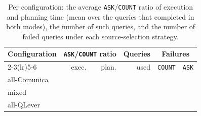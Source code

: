 \begin{table}[t]
	\centering
	\caption{Per configuration: the average \texttt{ASK}/\texttt{COUNT} ratio of
		execution and planning time (mean over the queries that completed in both
		modes), the number of such queries, and the number of failed queries under
		each source-selection strategy.}
	\label{tab:overall-ratio-adhoc}
	\begin{tabular}{lrrrrr}
		\toprule
		Configuration & \multicolumn{2}{c}{\texttt{ASK}/\texttt{COUNT} ratio} & Queries & \multicolumn{2}{c}{Failures} \\
		\cmidrule(lr){2-3}\cmidrule(lr){5-6}
		             & exec. & plan. & used & \texttt{COUNT} & \texttt{ASK} \\
		\midrule
		all-Comunica & {} & {} & {} & {} & {} \\
		mixed        & {} & {} & {} & {} & {} \\
		all-QLever   & {} & {} & {} & {} & {} \\
		\bottomrule
	\end{tabular}
\end{table}
